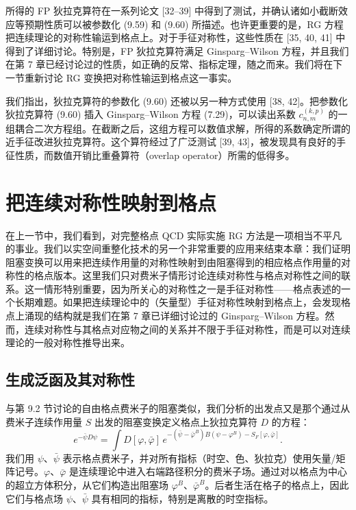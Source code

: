 所得的 FP 狄拉克算符在一系列论文 [32--39] 中得到了测试，并确认诸如小截断效应等预期性质可以被参数化 (9.59) 和 (9.60) 所描述。也许更重要的是，RG 方程把连续理论的对称性输运到格点上。对于手征对称性，这些性质在 [35, 40, 41] 中得到了详细讨论。特别是，FP 狄拉克算符满足 Ginsparg--Wilson 方程，并且我们在第 7 章已经讨论过的性质，如正确的反常、指标定理，随之而来。我们将在下一节重新讨论 RG 变换把对称性输运到格点这一事实。

我们指出，狄拉克算符的参数化 (9.60) 还被以另一种方式使用 [38, 42]。把参数化狄拉克算符 (9.60) 插入 Ginsparg--Wilson 方程 (7.29)，可以读出系数 $c^{(k,p)}_{n,m}$ 的一组耦合二次方程组。在截断之后，这组方程可以数值求解，所得的系数确定所谓的近手征改进狄拉克算符。这个算符经过了广泛测试 [39, 43]，被发现具有良好的手征性质，而数值开销比重叠算符（overlap operator）所需的低得多。

\section{把连续对称性映射到格点}
\label{sec:9.4}

在上一节中，我们看到，对完整格点 QCD 实际实施 RG 方法是一项相当不平凡的事业。我们以实空间重整化技术的另一个非常重要的应用来结束本章：我们证明阻塞变换可以用来把连续作用量的对称性映射到由阻塞得到的相应格点作用量的对称性的格点版本。这里我们只对费米子情形讨论连续对称性与格点对称性之间的联系。这一情形特别重要，因为所关心的对称性之一是手征对称性——格点表述的一个长期难题。如果把连续理论中的（矢量型）手征对称性映射到格点上，会发现格点上涌现的结构就是我们在第 7 章已详细讨论过的 Ginsparg--Wilson 方程。然而，连续对称性与其格点对应物之间的关系并不限于手征对称性，而是可以对连续理论的一般对称性推导出来。

\subsection{生成泛函及其对称性}
\label{sec:9.4.1}

与第 9.2 节讨论的自由格点费米子的阻塞类似，我们分析的出发点又是那个通过从费米子连续作用量 $S$ 出发的阻塞变换定义格点上狄拉克算符 $D$ 的方程：
\begin{equation}
  e^{-\bar\psi D\psi} = \int D[\varphi,\bar\varphi]\,
    e^{-(\bar\psi-\bar\varphi^B)B(\psi-\varphi^B) - S_F[\varphi,\bar\varphi]} .
\end{equation}
我们用 $\psi$、$\bar\psi$ 表示格点费米子，并对所有指标（时空、色、狄拉克）使用矢量/矩阵记号。$\varphi$、$\bar\varphi$ 是连续理论中进入右端路径积分的费米子场。通过对以格点为中心的超立方体积分，从它们构造出阻塞场 $\varphi^B$、$\bar\varphi^B$。后者生活在格子的格点上，因此它们与格点场 $\psi$、$\bar\psi$ 具有相同的指标，特别是离散的时空指标。

